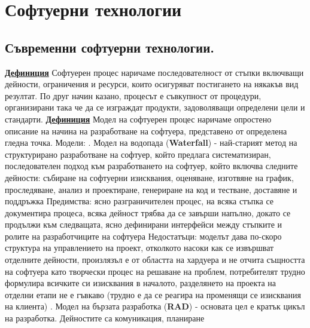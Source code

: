 \documentclass{article}
\begin{document}
\section*{Софтуерни технологии}

\subsection*{Съвременни софтуерни технологии.}

\textbf{\underline{Дефиниция}}
Софтуерен процес наричаме последователност от стъпки включващи дейности, ограничения и ресурси, които осигуряват
постигането на някакъв вид резултат. По друг начин казано, процесът е съвкупност от процедури, организирани така
че да се изграждат продукти, задоволяващи определени цели и стандарти. \newline\newline
\textbf{\underline{Дефиниция}}
Модел на софтуерен процес наричаме опростено описание на начина на разработване на софтуера, представено от
определена гледна точка. \newline\newline
Модели: \newline{}. Модел на водопада (\textbf{Waterfall}) - най-старият метод на структурирано разработване на софтуер, който предлага систематизиран,
последователен подход към разработването на софтуер, който включва следните дейности: събиране на софтуерни изисквания,
оценяване, изготвяне на график, проследяване, анализ и проектиране, генериране на код и тестване, доставяне и поддръжка \newline
Предимства: ясно разграничителен процес, на всяка стъпка се документира процеса, всяка дейност трябва да се завърши напълно, докато
се продължи към следващата, ясно дефинирани интерфейси между стъпките и ролите на разработчиците на софтуера \newline
Недостатъци: моделът дава по-скоро структура на управлението на проект, отколкото насоки как се извършват отделните дейности,
произлязъл е от областта на хардуера и не отчита същността на софтуера като творчески процес на решаване на проблем, потребителят
трудно формулира всичките си изисквания в началото, разделянето на проекта на отделни етапи не е гъвкаво (трудно е да се реагира
на променящи се изисквания на клиента) \newline{}. Модел на бързата разработка (\textbf{RAD}) - основата цел е кратък цикъл на разработка. Дейностите са комуникация, планиране
\end{document}
